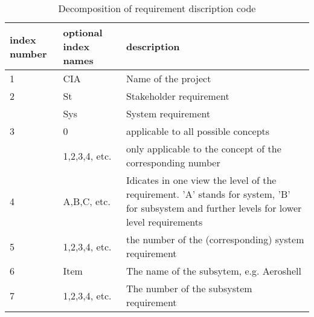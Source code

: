 \begin{table}[H]
    \caption {Decomposition of requirement discription code}
    \begin{tabular}{|p{}|p{}|p{}|}
    \hline
    index number & optional index names & description                                                                                                                                  \\ \hline \hline
    1            & CIA                  & Name of the project                                                                                                                          \\ \hline
    2            & St                   & Stakeholder requirement                                                                                                                      \\
    ~            & Sys                  & System requirement                                                                                                                           \\ \hline
    3            & 0                    & applicable to all possible concepts                                                                                                          \\
    ~            & 1,2,3,4, etc.        & only applicable to the concept of the corresponding number                                                                                   \\ \hline
    4            & A,B,C, etc.          & Idicates in one view the level of the requirement. 'A' stands for system, 'B' for subsystem  and further levels for lower level requirements \\ \hline
    5            & 1,2,3,4, etc.        & the number of the (corresponding) system requirement                                                                                         \\ \hline
    6            & Item                 & The name of the subsytem, e.g. Aeroshell                                                                                                     \\ \hline
    7            & 1,2,3,4, etc.        & The number of the subsystem requirement                                                                                                      \\ \hline
    \end{tabular}
    \label{tab:description}
\end{table}

